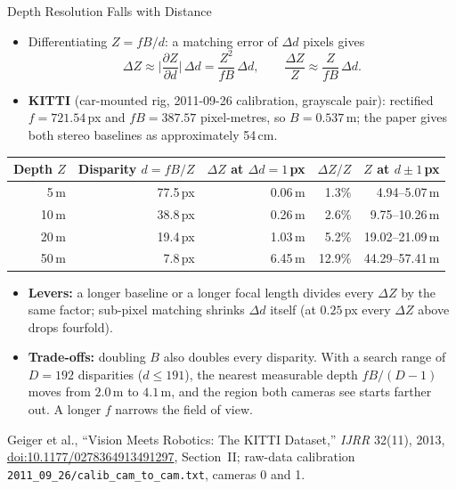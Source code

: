 \begin{frame}{Depth Resolution Falls with Distance}
  \begin{itemize}\footnotesize\itemsep0.25em
    \item Differentiating $Z = fB/d$: a matching error of $\Delta d$ pixels gives
    \[ \Delta Z \approx \Big|\frac{\partial Z}{\partial d}\Big|\,\Delta d = \frac{Z^2}{fB}\,\Delta d, \qquad \frac{\Delta Z}{Z} \approx \frac{Z}{fB}\,\Delta d . \]
    \item \textbf{KITTI} (car-mounted rig, 2011-09-26 calibration, grayscale pair): rectified $f = 721.54$\,px and $fB = 387.57$ pixel-metres, so $B = 0.537$\,m; the paper gives both stereo baselines as approximately 54\,cm.
  \end{itemize}
  \vspace{0.1em}
  {\centering\scriptsize
  \begin{tabular}{r r r r r}
    \toprule
    \textbf{Depth $Z$} & \textbf{Disparity $d = fB/Z$} & \textbf{$\Delta Z$ at $\Delta d = 1$\,px} & \textbf{$\Delta Z/Z$} & \textbf{$Z$ at $d \pm 1$\,px} \\
    \midrule
    5\,m & 77.5\,px & 0.06\,m & 1.3\% & 4.94--5.07\,m \\
    10\,m & 38.8\,px & 0.26\,m & 2.6\% & 9.75--10.26\,m \\
    20\,m & 19.4\,px & 1.03\,m & 5.2\% & 19.02--21.09\,m \\
    50\,m & 7.8\,px & 6.45\,m & 12.9\% & 44.29--57.41\,m \\
    \bottomrule
  \end{tabular}\par}
  \vspace{0.2em}
  \begin{itemize}\footnotesize\itemsep0.25em
    \item \textbf{Levers:} a longer baseline or a longer focal length divides every $\Delta Z$ by the same factor; sub-pixel matching shrinks $\Delta d$ itself (at $0.25$\,px every $\Delta Z$ above drops fourfold).
    \item \textbf{Trade-offs:} doubling $B$ also doubles every disparity. With a search range of $D = 192$ disparities ($d \leq 191$), the nearest measurable depth $fB/(D-1)$ moves from $2.0$\,m to $4.1$\,m, and the region both cameras see starts farther out. A longer $f$ narrows the field of view.
  \end{itemize}
  \vspace{0.1em}
  {\scriptsize Geiger et al., ``Vision Meets Robotics: The KITTI Dataset,'' \textit{IJRR} 32(11), 2013, \href{https://doi.org/10.1177/0278364913491297}{doi:10.1177/0278364913491297}, Section~II; raw-data calibration \texttt{2011\_09\_26/calib\_cam\_to\_cam.txt}, cameras 0 and 1.\par}
\end{frame}

